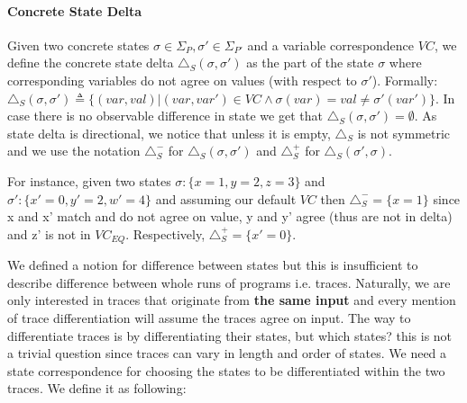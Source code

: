 \paragraph{Concrete State Delta} 
Given two concrete states $\sigma \in \Sigma_P,\sigma' \in \Sigma_{P'}$ and a variable correspondence $VC$, we define the concrete state delta $\triangle_S(\sigma,\sigma')$ as the part of the state $\sigma$ where corresponding variables do not agree on values (with respect to $\sigma'$). Formally: $\triangle_{S}(\sigma,\sigma') \triangleq \{ (var,val) | (var,var') \in VC \wedge \sigma(var) = val \neq \sigma'(var')\}$. In case there is no observable difference in state we get that $\triangle_{S}(\sigma,\sigma') = \emptyset$. As state delta is directional, we notice that unless it is empty, $\triangle_{S}$ is not symmetric and we use the notation $\triangle_{S}^{-}$ for $\triangle_{S}(\sigma,\sigma')$ and $\triangle_{S}^{+}$ for $\triangle_{S}(\sigma',\sigma)$.


For instance, given two states $\sigma:\{x=1,y=2,z=3\}$ and $\sigma':\{x'=0,y'=2,w'=4\}$ and assuming our default $VC$ then $\triangle_{S}^{-} = \{x=1\}$ since x and x' match and do not agree on value, y and y' agree (thus are not in delta) and z' is not in $VC_{EQ}$. Respectively, $\triangle_{S}^{+} = \{x'=0\}$. %

We defined a notion for difference between states but this is insufficient to describe difference between whole runs of programs i.e. traces. Naturally, we are only interested in traces that originate from \textbf{the same input}  and every mention of trace differentiation will assume the traces agree on input. The way to differentiate traces is by differentiating their states, but which states? this is not a trivial question since traces can vary in length and order of states. We need a state correspondence for choosing the states to be differentiated within the two traces. We define it as following:

